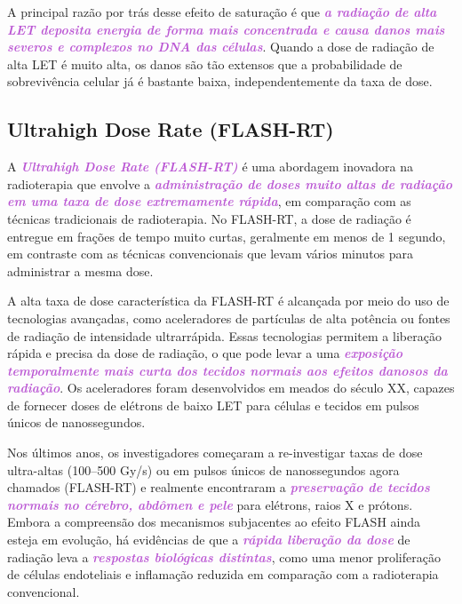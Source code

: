 \documentclass[11pt,a4paper]{article}
\begin{document}
	A principal razão por trás desse efeito de saturação é que \textcolor{MediumOrchid}{\textbf{\textit{a radiação de alta LET deposita energia de forma mais concentrada e causa danos mais severos e complexos no DNA das células}}}. Quando a dose de radiação de alta LET é muito alta, os danos são tão extensos que a probabilidade de sobrevivência celular já é bastante baixa, independentemente da taxa de dose.

\subsection*{Ultrahigh Dose Rate (FLASH-RT)}

	A \textcolor{MediumOrchid}{\textbf{\textit{Ultrahigh Dose Rate (FLASH-RT)}}} é uma abordagem inovadora na radioterapia que envolve a \textcolor{MediumOrchid}{\textbf{\textit{administração de doses muito altas de radiação em uma taxa de dose extremamente rápida}}}, em comparação com as técnicas tradicionais de radioterapia. No FLASH-RT, a dose de radiação é entregue em frações de tempo muito curtas, geralmente em menos de 1 segundo, em contraste com as técnicas convencionais que levam vários minutos para administrar a mesma dose.

	A alta taxa de dose característica da FLASH-RT é alcançada por meio do uso de tecnologias avançadas, como aceleradores de partículas de alta potência ou fontes de radiação de intensidade ultrarrápida. Essas tecnologias permitem a liberação rápida e precisa da dose de radiação, o que pode levar a uma \textcolor{MediumOrchid}{\textbf{\textit{exposição temporalmente mais curta dos tecidos normais aos efeitos danosos da radiação}}}. Os aceleradores foram desenvolvidos em meados do século XX, capazes de fornecer doses de elétrons de baixo LET para células e tecidos em pulsos únicos de nanossegundos.

	Nos últimos anos, os investigadores começaram a re-investigar taxas de dose ultra-altas (100–500 Gy/s) ou em pulsos únicos de nanossegundos agora chamados (FLASH-RT) e realmente encontraram a \textcolor{MediumOrchid}{\textbf{\textit{preservação de tecidos normais no cérebro, abdômen e pele}}} para elétrons, raios X e prótons. Embora a compreensão dos mecanismos subjacentes ao efeito FLASH ainda esteja em evolução, há evidências de que a \textcolor{MediumOrchid}{\textbf{\textit{rápida liberação da dose}}} de radiação leva a \textcolor{MediumOrchid}{\textbf{\textit{respostas biológicas distintas}}}, como uma menor proliferação de células endoteliais e inflamação reduzida em comparação com a radioterapia convencional. 
\end{document}
